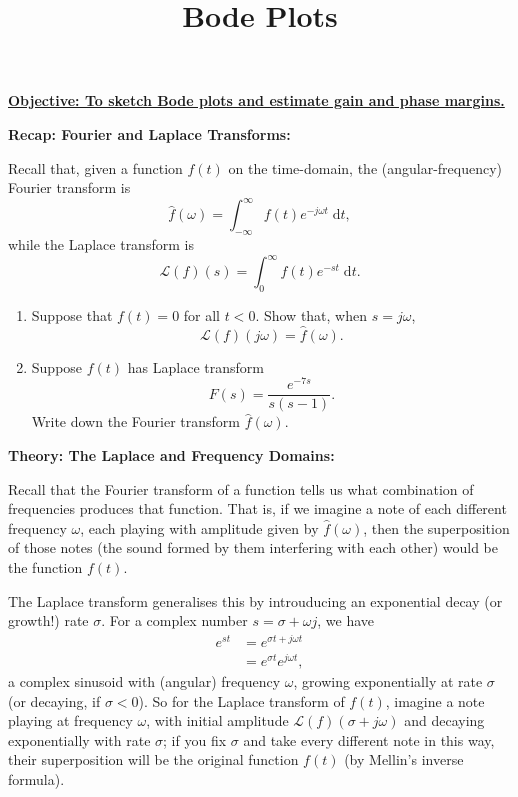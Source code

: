 \documentclass{article}
\newcommand{\diff}{\;\mathrm{d}}
\begin{document}
\title{Bode Plots}
\date{}

\maketitle
\thispagestyle{empty}

\Large

\vskip -10mm

\textbf{\underline{Objective: To sketch Bode plots and estimate gain and phase margins.}}



\vspace{5mm}



\textbf{Recap: Fourier and Laplace Transforms:}\bigskip

Recall that, given a function $f(t)$ on the time-domain, the (angular-frequency) Fourier transform is
\[\hat{f}(\omega)=\int_{-\infty}^\infty f(t)e^{-j\omega t}\diff t,\]
while the Laplace transform is
\[\mathcal{L}(f)(s)=\int_0^\infty f(t)e^{-st}\diff t.\]


\begin{enumerate}
	\item Suppose that $f(t)=0$ for all $t<0$. Show that, when $s=j\omega$,
		\[\mathcal{L}(f)(j\omega)=\hat{f}(\omega).\]
	\item Suppose $f(t)$ has Laplace transform
		\[F(s)=\frac{e^{-7s}}{s(s-1)}.\]
		Write down the Fourier transform $\hat{f}(\omega)$.
\end{enumerate}







\clearpage


\textbf{Theory: The Laplace and Frequency Domains:}\bigskip



Recall that the Fourier transform of a function tells us what combination of frequencies produces that function. That is, if we imagine a note of each different frequency $\omega$, each playing with amplitude given by $\hat{f}(\omega)$, then the superposition of those notes (the sound formed by them interfering with each other) would be the function $f(t)$.

The Laplace transform generalises this by introuducing an exponential decay (or growth!) rate $\sigma$. For a complex number $s=\sigma+\omega j$, we have
\begin{align*}
	e^{st}&=e^{\sigma t + j\omega t}\\
	&=e^{\sigma t}e^{j\omega t},
\end{align*}
a complex sinusoid with (angular) frequency $\omega$, growing exponentially at rate $\sigma$ (or decaying, if $\sigma<0$). So for the Laplace transform of $f(t)$, imagine a note playing at frequency $\omega$, with initial amplitude $\mathcal{L}(f)(\sigma +j\omega)$ and decaying exponentially with rate $\sigma$; if you fix $\sigma$ and take every different note in this way, their superposition will be the original function $f(t)$ (by Mellin's inverse formula).
\end{document}
